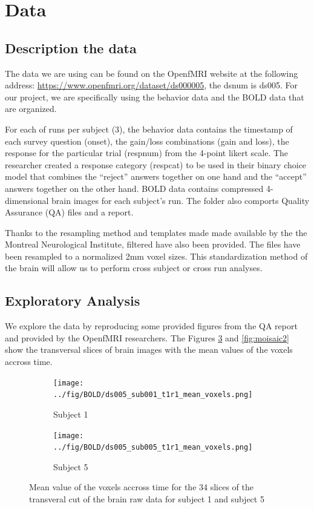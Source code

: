 \section{Data}
\subsection{Description the data}
\noindent
\par The data we are using can be found on the OpenfMRI website at the following
address: \url{https://www.openfmri.org/dataset/ds000005}, the dsnum is ds005.
For our project, we are specifically using the behavior data and the BOLD data
that are organized. 

\noindent
\par For each of runs per subject (3), the behavior data contains the timestamp of
each survey question (onset), the gain/loss combinations (gain and loss), the
response for the particular trial (respnum) from the 4-point likert scale. 
The researcher created a response category (respcat) to be used in their binary
choice model that combines the “reject” answers together on one hand and the 
“accept” answers together on the other hand. BOLD data contains compressed  
4-dimensional brain images for each subject’s run. The folder also comports
Quality Assurance (QA) files and a report.

\noindent
\par Thanks to the resampling method and templates made made available by the 
the Montreal Neurological Institute, filtered have also been provided. 
The files have been resampled to a normalized 2mm voxel sizes. This standardization
method of the brain will allow us to perform cross subject or cross run analyses.

\subsection{Exploratory Analysis}

\noindent
We explore the data by reproducing some provided figures from the QA report and 
provided by the OpenfMRI researchers. The Figures \ref{fig:moisaic1} and 
\ref{fig:moisaic2} show the transversal slices of brain images with the mean values 
of the voxels accross time.

\begin{figure}[H]
\begin{subfigure}{.5\textwidth}
  \centering
  \texttt{[image: ../fig/BOLD/ds005\_sub001\_t1r1\_mean\_voxels.png]}
  \caption{Subject 1}
  \label{fig:mosaic1a}
\end{subfigure}%
\begin{subfigure}{.5\textwidth}
  \centering
  \texttt{[image: ../fig/BOLD/ds005\_sub005\_t1r1\_mean\_voxels.png]}
  \caption{Subject 5}
  \label{fig:mosaic1b}
\end{subfigure}
\caption{Mean value of the voxels accross time for the 34 slices of the transveral cut
         of the brain raw data for subject 1 and subject 5}
\label{fig:moisaic1}
\end{figure}


